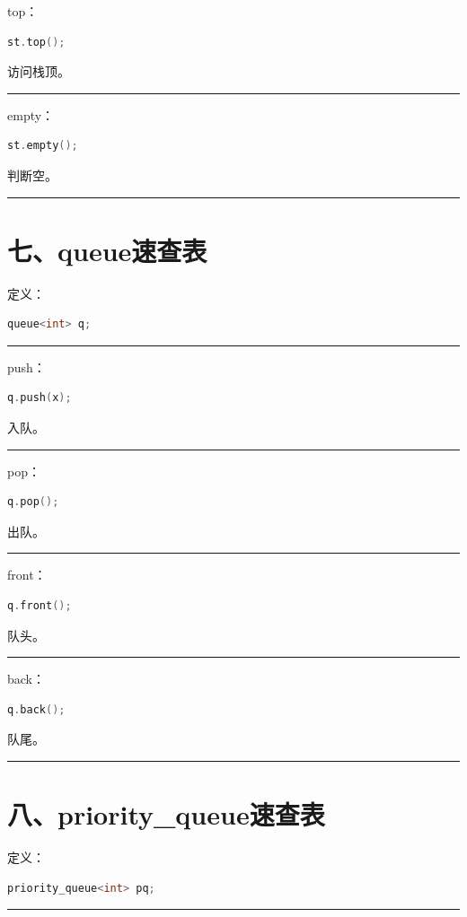 \documentclass[10pt,twocolumn]{extarticle}
\begin{document}
top：
\begin{lstlisting}[language=C++]
st.top();
\end{lstlisting}
访问栈顶。

\noindent\rule{\linewidth}{0.4pt}

empty：
\begin{lstlisting}[language=C++]
st.empty();
\end{lstlisting}
判断空。

\noindent\rule{\linewidth}{0.4pt}

\section{七、queue速查表}

定义：
\begin{lstlisting}[language=C++]
queue<int> q;
\end{lstlisting}

\noindent\rule{\linewidth}{0.4pt}

push：
\begin{lstlisting}[language=C++]
q.push(x);
\end{lstlisting}
入队。

\noindent\rule{\linewidth}{0.4pt}

pop：
\begin{lstlisting}[language=C++]
q.pop();
\end{lstlisting}
出队。

\noindent\rule{\linewidth}{0.4pt}

front：
\begin{lstlisting}[language=C++]
q.front();
\end{lstlisting}
队头。

\noindent\rule{\linewidth}{0.4pt}

back：
\begin{lstlisting}[language=C++]
q.back();
\end{lstlisting}
队尾。

\noindent\rule{\linewidth}{0.4pt}

\section{八、priority\_queue速查表}

定义：
\begin{lstlisting}[language=C++]
priority_queue<int> pq;
\end{lstlisting}

\noindent\rule{\linewidth}{0.4pt}
\end{document}
